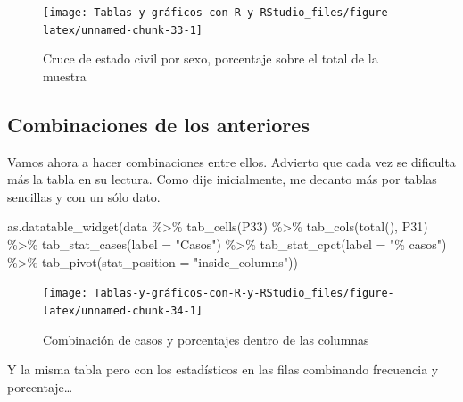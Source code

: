 \documentclass[
]{book}
\newenvironment{Shaded}{\begin{snugshade}}{\end{snugshade}}
\newcommand{\AttributeTok}[1]{\textcolor[rgb]{0.77,0.63,0.00}{#1}}
\newcommand{\FunctionTok}[1]{\textcolor[rgb]{0.00,0.00,0.00}{#1}}
\newcommand{\NormalTok}[1]{#1}
\newcommand{\SpecialCharTok}[1]{\textcolor[rgb]{0.00,0.00,0.00}{#1}}
\newcommand{\StringTok}[1]{\textcolor[rgb]{0.31,0.60,0.02}{#1}}
\begin{document}
\begin{figure}[H]

{\centering \texttt{[image: Tablas-y-gráficos-con-R-y-RStudio\_files/figure-latex/unnamed-chunk-33-1]} 

}

\caption{Cruce de estado civil por sexo, porcentaje sobre el total de la muestra}\label{fig:unnamed-chunk-33}
\end{figure}

\hypertarget{combinaciones-de-los-anteriores}{%
\subsection{Combinaciones de los anteriores}\label{combinaciones-de-los-anteriores}}

Vamos ahora a hacer combinaciones entre ellos. Advierto que cada vez se dificulta más la tabla en su lectura. Como dije inicialmente, me decanto más por tablas sencillas y con un sólo dato.

\begin{Shaded}
\begin{Highlighting}[]
\FunctionTok{as.datatable\_widget}\NormalTok{(data }\SpecialCharTok{\%\textgreater{}\%} \FunctionTok{tab\_cells}\NormalTok{(P33) }\SpecialCharTok{\%\textgreater{}\%} \FunctionTok{tab\_cols}\NormalTok{(}\FunctionTok{total}\NormalTok{(), }
\NormalTok{  P31) }\SpecialCharTok{\%\textgreater{}\%} \FunctionTok{tab\_stat\_cases}\NormalTok{(}\AttributeTok{label =} \StringTok{"Casos"}\NormalTok{) }\SpecialCharTok{\%\textgreater{}\%} \FunctionTok{tab\_stat\_cpct}\NormalTok{(}\AttributeTok{label =} \StringTok{"\% casos"}\NormalTok{) }\SpecialCharTok{\%\textgreater{}\%} 
  \FunctionTok{tab\_pivot}\NormalTok{(}\AttributeTok{stat\_position =} \StringTok{"inside\_columns"}\NormalTok{))}
\end{Highlighting}
\end{Shaded}

\begin{figure}[H]

{\centering \texttt{[image: Tablas-y-gráficos-con-R-y-RStudio\_files/figure-latex/unnamed-chunk-34-1]} 

}

\caption{Combinación de casos y porcentajes dentro de las columnas}\label{fig:unnamed-chunk-34}
\end{figure}

Y la misma tabla pero con los estadísticos en las filas combinando frecuencia y porcentaje\ldots{}
\end{document}
